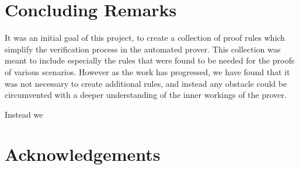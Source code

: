 \documentclass[11pt,journal]{IEEEtran}
\begin{document}
	
	\section{Concluding Remarks}
	It was an initial goal of this project, to create a collection of proof rules which simplify the verification process in the automated prover. This collection was meant to include especially the rules that were found to be needed for the proofs of various scenarios. However as the work has progressed, we have found that it was not necessary to create additional rules, and instead any obstacle could be circumvented with a deeper understanding of the inner workings of the prover.
	
	Instead we 
	

	
	\section{Acknowledgements}
	
	\IEEEPARstart{}{} 
	
\end{document}

